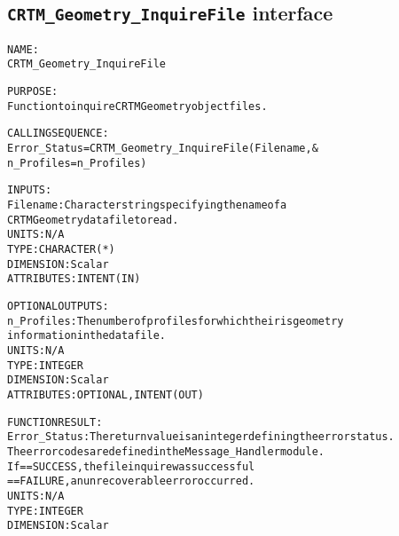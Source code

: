 \subsection{\texttt{CRTM\_Geometry\_InquireFile} interface}
  \label{sec:CRTM_Geometry_InquireFile_interface}
  \begin{alltt}
 
  NAME:
        CRTM_Geometry_InquireFile
 
  PURPOSE:
        Function to inquire CRTM Geometry object files.
 
  CALLING SEQUENCE:
        Error_Status = CRTM_Geometry_InquireFile( Filename               , &
                                                  n_Profiles = n_Profiles  )
 
  INPUTS:
        Filename:       Character string specifying the name of a
                        CRTM Geometry data file to read.
                        UNITS:      N/A
                        TYPE:       CHARACTER(*)
                        DIMENSION:  Scalar
                        ATTRIBUTES: INTENT(IN)
 
  OPTIONAL OUTPUTS:
        n_Profiles:     The number of profiles for which their is geometry 
                        information in the data file.
                        UNITS:      N/A
                        TYPE:       INTEGER
                        DIMENSION:  Scalar
                        ATTRIBUTES: OPTIONAL, INTENT(OUT)
 
  FUNCTION RESULT:
        Error_Status:   The return value is an integer defining the error status.
                        The error codes are defined in the Message_Handler module.
                        If == SUCCESS, the file inquire was successful
                           == FAILURE, an unrecoverable error occurred.
                        UNITS:      N/A
                        TYPE:       INTEGER
                        DIMENSION:  Scalar
 
  \end{alltt}
